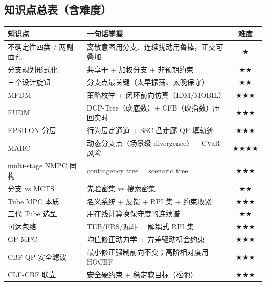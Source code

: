 \subsection*{知识点总表（含难度）}
\begin{table}[H]\centering\small
\begin{tabular}{p{}p{}c}
\toprule
知识点 & 一句话掌握 & 难度 \\
\midrule
不确定性四类 / 两副面孔 & 离散意图用分支、连续扰动用鲁棒，正交可叠加 & $\bigstar$ \\
分支规划形式化 & 共享干 + 加权分支 + 非预期约束 & $\bigstar\bigstar$ \\
三个设计旋钮 & 分支点最关键（太早振荡、太晚保守） & $\bigstar\bigstar$ \\
MPDM & 策略枚举 + 闭环前向仿真（IDM/MOBIL） & $\bigstar\bigstar\bigstar$ \\
EUDM & DCP-Tree（砍底数）+ CFB（砍指数）压回实时 & $\bigstar\bigstar\bigstar$ \\
EPSILON 分层 & 行为层定通道 + SSC 凸走廊 QP 填轨迹 & $\bigstar\bigstar\bigstar$ \\
MARC & 动态分支点（场景级 divergence）+ CVaR 风险 & $\bigstar\bigstar\bigstar\bigstar$ \\
multi-stage NMPC 同构 & contingency tree = scenario tree & $\bigstar\bigstar\bigstar$ \\
分支 vs MCTS & 先验密集 vs 搜索密集 & $\bigstar\bigstar$ \\
Tube MPC 本质 & 名义系统 + 反馈 + RPI 集 + 约束收紧 & $\bigstar\bigstar\bigstar$ \\
三代 Tube 选型 & 用在线计算换保守度的连续谱 & $\bigstar\bigstar$ \\
可达包络 & TEB/FRS/漏斗 = 解耦式 RPI 集 & $\bigstar\bigstar\bigstar$ \\
GP-MPC & 均值修正动力学 + 方差驱动机会约束 & $\bigstar\bigstar\bigstar$ \\
CBF-QP 安全滤波 & 最小修正强制前向不变；高阶相对度用 HOCBF & $\bigstar\bigstar\bigstar$ \\
CLF-CBF 联立 & 安全硬约束 + 稳定软目标（松弛） & $\bigstar\bigstar\bigstar$ \\
\bottomrule
\end{tabular}
\end{table}

